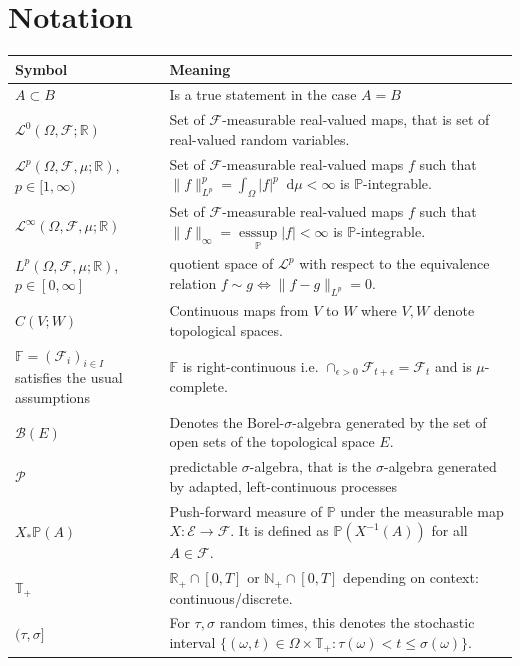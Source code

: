 \documentclass[11pt,a4paper,twoside,openany]{report}
\newcommand{\diff}{\mathop{}\!\mathrm{d}}
\theoremstyle{plain} %
\theoremstyle{definition} %
\theoremstyle{remark} %
\begin{document}
\chapter*{Notation}
\noindent
\vspace{0.75\baselineskip}
\noindent\begin{tabularx}{\textwidth}{@{}l X@{}}
\toprule
\textbf{Symbol} & \textbf{Meaning}\\
\midrule
\(A\subset B\) & Is a true statement in the case \(A=B\)
\\
$\mathcal{L}^0(\Omega,\mathcal{F};\mathbb{R})$ & Set of $\mathcal{F}$-measurable real-valued maps, that is set of real-valued random variables.\\
$\mathcal{L}^p(\Omega,\mathcal{F},\mu;\mathbb{R})$, $p\in[1,\infty)$ & Set of $\mathcal{F}$-measurable real-valued maps $f$ such that $\lVert f\rVert_{L^p}^p=\int_{\Omega}|f|^p\diff \mu<\infty$ is $\mathbb{P}$-integrable.\\
$\mathcal{L}^{\infty}(\Omega,\mathcal{F},\mu;\mathbb{R})$ & Set of $\mathcal{F}$-measurable real-valued maps $f$ such that $\lVert f\rVert_{\infty}=\underset{\mathbb{P}}{\operatorname*{ess\sup}}|f|<\infty$ is $\mathbb{P}$-integrable.\\
$L^p(\Omega, \mathcal{F},\mu;\mathbb{R})$, $p\in [0,\infty]$ & quotient space of $\mathcal{L}^p$ with respect to the equivalence relation $f\sim g\iff \lVert f-g\rVert_{L^p}=0$.\\
$C(V;W)$ & Continuous maps from $V$ to $W$ where $V,W$ denote topological spaces.\\
$\mathbb{F}=(\mathcal{F}_i)_{i\in I}$ satisfies the usual assumptions & $\mathbb{F}$ is right-continuous i.e. $\cap_{\epsilon>0}\mathcal{F}_{t+\epsilon}=\mathcal{F}_t$ and is $\mu$-complete.\\
$\mathcal{B}(E)$&Denotes the Borel-\(\sigma\)-algebra generated by the set of open sets of the topological space \(E\).
\\
$\mathcal{P}$& predictable \(\sigma\)-algebra, that is the \(\sigma\)-algebra generated by adapted, left-continuous processes
\\
$X_*\mathbb{P}(A)$ & Push-forward measure of $\mathbb{P}$ under the measurable map $X:\mathcal{E}\to\mathcal{F}$. It is defined as $\mathbb{P}(X^{-1}(A))$ for all $A\in\mathcal{F}$.\\
$\mathbb{T}_+$ & $\mathbb{R}_+\cap[0,T]$ or $\mathbb{N}_+\cap[0,T]$ depending on context: continuous/discrete.\\
$(\tau,\sigma]$ & For $\tau,\sigma$ random times, this denotes the stochastic interval $\{(\omega,t)\in\Omega\times \mathbb{T}_+:\tau(\omega)<t\leq\sigma(\omega)\}$.\\

\end{tabularx}
\end{document}
